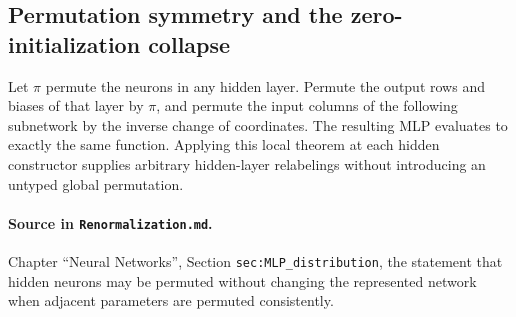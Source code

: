 \subsection{Permutation symmetry and the zero-initialization collapse}

\begin{theorem}
\label{thm:renorm:hiddenRelabeling}
Let $\pi$ permute the neurons in any hidden layer.  Permute the output rows and biases of that layer
by $\pi$, and permute the input columns of the following subnetwork by the inverse change of
coordinates.  The resulting MLP evaluates to exactly the same function.  Applying this local
theorem at each hidden constructor supplies arbitrary hidden-layer relabelings without introducing
an untyped global permutation.

\paragraph{Source in \texttt{Renormalization.md}.}
Chapter ``Neural Networks'', Section \texttt{sec:MLP\_distribution}, the statement that hidden
neurons may be permuted without changing the represented network when adjacent parameters are
permuted consistently.
\end{theorem}

